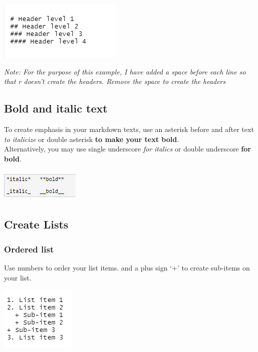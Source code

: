 \documentclass[
]{book}
\let\origfigure\figure
\let\endorigfigure\endfigure
\renewenvironment{figure}[1][2] {
    \expandafter\origfigure\expandafter[H]
} {
    \endorigfigure
}
\begin{document}
\begin{figure}
\centering
\includegraphics{tutorial_screenshots/headers.png}
\caption{headers}
\end{figure}

\emph{Note: For the purpose of this example, I have added a space before each line so that r doesn't create the headers. Remove the space to create the headers}

\hypertarget{bold-and-italic-text}{%
\subsection{Bold and italic text}\label{bold-and-italic-text}}

To create emphasis in your markdown texts, use an asterisk before and after text \emph{to italicize} or double asterisk \textbf{to make your text bold}.\\
Alternatively, you may use single underscore \emph{for italics} or double underscore \textbf{for bold}.

\begin{figure}
\centering
\includegraphics{tutorial_screenshots/italics_bold.png}
\caption{text emphasis}
\end{figure}

\hypertarget{create-lists}{%
\subsection{Create Lists}\label{create-lists}}

\hypertarget{ordered-list}{%
\subsubsection{Ordered list}\label{ordered-list}}

Use numbers to order your list items.
and a plus sign `+' to create sub-items on your list.

\begin{figure}
\centering
\includegraphics{tutorial_screenshots/ordered_list.png}
\caption{ordered list}
\end{figure}
\end{document}
